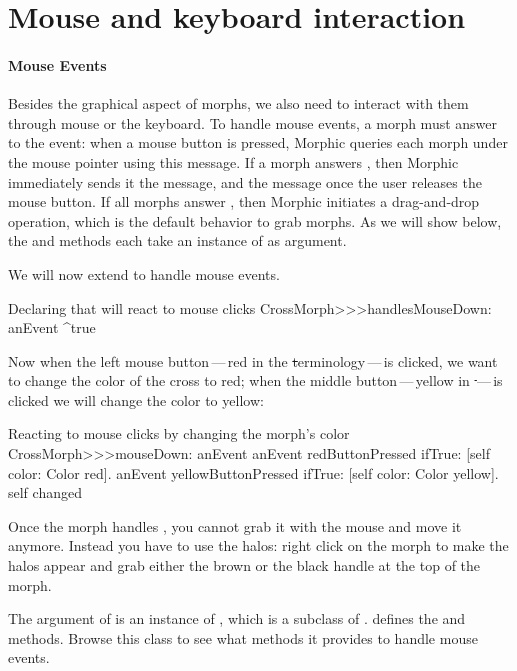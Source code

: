 \documentclass[a4paper,10pt,twoside]{book}
\begin{document}
\section{Mouse and keyboard interaction}

\paragraph{Mouse Events}
Besides the graphical aspect of morphs, we also need to interact with them through mouse or the keyboard.
To handle mouse events, a morph must answer  to the  event: when a mouse button is pressed, Morphic queries each morph under the mouse pointer using this message. If a morph answers , then Morphic immediately sends it the  message, and the  message once the user releases the mouse button.
If all morphs answer , then Morphic initiates a drag-and-drop operation, which is the default behavior to grab morphs.
As we will show below, the  and  methods each take an instance of  as argument.

We will now extend  to handle mouse events.

\begin{method}{Declaring that  will react to mouse clicks}
CrossMorph>>>handlesMouseDown: anEvent
   ^true
\end{method}

Now when the left mouse button\,---\,red in the \st terminology\,---\,is clicked, we want to change the color of the cross to red; when the middle button\,---\,yellow in \st\,---\,is clicked we will change the color to yellow:
\begin{method}{Reacting to mouse clicks by changing the morph's color}
CrossMorph>>>mouseDown: anEvent
   anEvent redButtonPressed
      ifTrue: [self color: Color red].
   anEvent yellowButtonPressed
      ifTrue: [self color: Color yellow].
   self changed
\end{method}

Once the morph handles , you cannot grab it with the mouse and move it anymore. Instead you have to use the halos: right click on the morph to make the halos appear and grab either the brown or the black handle at the top of the morph.

The  argument of  is an instance of \mbox{,} which is a subclass of .  defines the  and  methods. Browse this class to see what methods it provides to handle mouse events.
\end{document}
